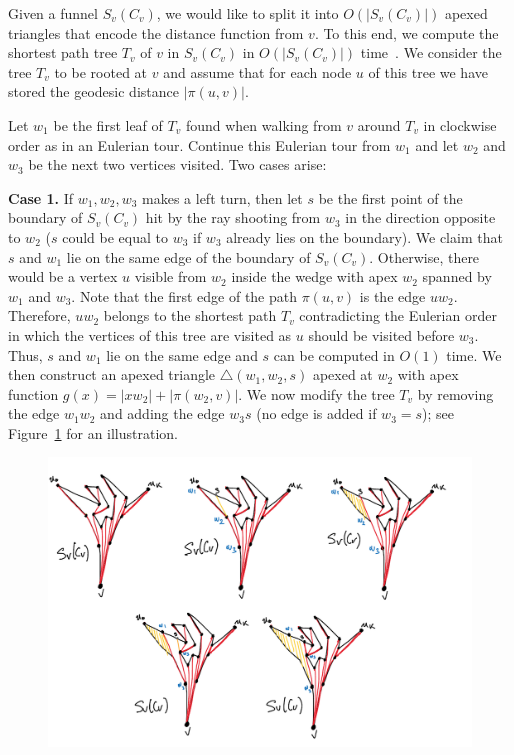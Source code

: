 \documentclass[a4paper,UKenglish]{lipics}
\newcommand{\fn}[2]{\ensuremath{S_{\scriptscriptstyle #1}(#2)}}
\newcommand{\g}[2]{\ensuremath{|\pi(#1, #2)|}}
\newcommand{\p}[2]{\ensuremath{\pi(#1, #2)}}
\begin{document}
Given a funnel $\fn{v}{C_v}$, we would like to split it into $O(|\fn{v}{C_v}|)$ apexed triangles that encode the distance function from $v$.
To this end, we compute the shortest path tree $T_v$ of $v$ in $\fn{v}{C_v}$ in $O(|\fn{v}{C_v}|)$ time~\cite{guibasShortestPathQueries}.
We consider the tree $T_v$ to be rooted at $v$ and assume that for each node $u$ of this tree 
we have stored the geodesic distance $\g{u}{v}$. 

Let $w_1$ be the first leaf of $T_v$ found when walking from $v$ around $T_v$ in clockwise order as in an Eulerian tour.
Continue this Eulerian tour from $w_1$ and let $w_2$ and $w_3$ be the next two vertices visited. Two cases arise:

\textbf{Case 1.} If $w_1, w_2, w_3$ makes a left turn, then let $s$ be the first point of the boundary of $\fn{v}{C_v}$ hit by the ray shooting from $w_3$ in the direction opposite to $w_2$ ($s$ could be equal to $w_3$ if $w_3$ already lies on the boundary).
We claim that $s$ and $w_1$ lie on the same edge of the boundary of $\fn{v}{C_v}$. 
Otherwise, there would be a vertex $u$ visible from $w_2$ inside the wedge with apex $w_2$ spanned by $w_1$ and $w_3$.
Note that the first edge of the path $\p{u}{v}$ is the edge $uw_2$. Therefore, $uw_2$ belongs to the shortest path $T_v$ contradicting the Eulerian order in which the vertices of this tree are visited as $u$ should be visited before $w_3$. Thus, $s$ and $w_1$ lie on the same edge and $s$ can be computed in $O(1)$ time.
We then construct an apexed triangle $\triangle(w_1, w_2, s)$ apexed at $w_2$ with apex function $g(x) = |x w_2| + \g{w_2}{v}$.
We now modify the tree $T_v$ by removing the edge $w_1w_2$ and adding the edge $w_3s$ (no edge is added if $w_3 = s$); see Figure~\ref{fig:Funnel Cover} for an illustration.

\begin{figure}[tb]
\centering
\includegraphics[width=1\textwidth]{img/FunnelCover.pdf}
\caption{\small }
\label{fig:Funnel Cover}
\end{figure}
\end{document}
